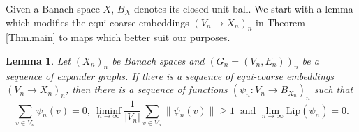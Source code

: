 \documentclass[11pt]{amsart}
\newcommand{\Lip}{\mathrm{Lip}}
\newtheorem{lemma}[theorem]{Lemma}
\theoremstyle{definition}
\theoremstyle{remark}
\begin{document}
 Given a Banach space $X$, $B_X$ denotes its closed unit ball. We start with a lemma which modifies the equi-coarse embeddings $(V_n\to X_n)_n$ in Theorem \ref{Thm.main} to maps which better suit our purposes. 

\begin{lemma}\label{Lemma}
    Let $(X_n)_n$ be Banach spaces and $(G_n=(V_n,E_n))_n$ be a sequence of expander graphs. If there is a sequence of  equi-coarse embeddings $(V_n\to X_n)_n$, then there is a sequence of functions $(\psi_n\colon V_n\to B_{X_n})_n$ such that 
    \begin{equation}\label{Eq.prop.psi}
    \sum_{v\in V_n}\psi_n(v)=0, \ \liminf_{n\to \infty}\frac{1}{|V_n|}\sum_{v\in V_n}\|\psi_n(v)\|\geq 1\ \text{ and } \lim_{n\to\infty}\Lip(\psi_n)=0.
    \end{equation}
\end{lemma}
\end{document}
